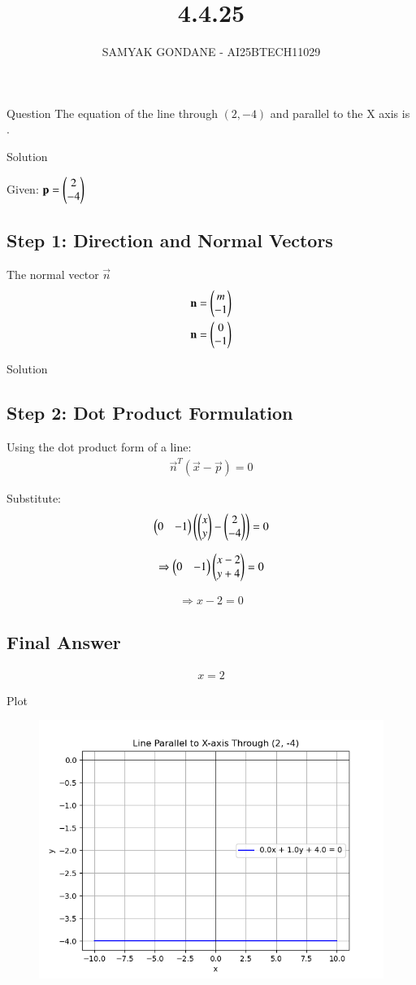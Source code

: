 \documentclass{beamer}
\title 
{4.4.25}
\date{}
\author
{SAMYAK GONDANE - AI25BTECH11029}
\begin{document}
\frame{\titlepage}

\begin{frame}{Question}
The equation of the line through $(2, -4)$ and parallel to the X axis is \underline{\hspace{2 cm}}.
\end{frame}

\begin{frame}{Solution}

Given: $\mathbf{p} = \begin{pmatrix}2 \\ -4\end{pmatrix}$

\subsection*{Step 1: Direction and Normal Vectors}
The normal vector $\vec{n}$
\begin{align}
\mathbf{n} = \begin{pmatrix}m \\ -1\end{pmatrix}\\
\mathbf{n} = \begin{pmatrix}0 \\ -1\end{pmatrix}
\end{align}
\end{frame}

\begin{frame}{Solution}
\subsection*{Step 2: Dot Product Formulation}
Using the dot product form of a line:
\begin{align}
\vec{n}^T (\vec{x} - \vec{p}) = 0
\end{align}

Substitute:
\begin{align}
\begin{pmatrix}0 & -1\end{pmatrix} \begin{pmatrix}\begin{pmatrix}x \\ y\end{pmatrix} - \begin{pmatrix}2 \\ -4\end{pmatrix}\end{pmatrix} = 0
\end{align}

\begin{align}
\Rightarrow \begin{pmatrix}0 & -1\end{pmatrix} \begin{pmatrix}x - 2 \\ y + 4\end{pmatrix} = 0
\end{align}

\begin{align}
\Rightarrow x - 2 = 0
\end{align}

\subsection*{Final Answer}
\begin{align}
\boxed{x = 2}
\end{align}
\end{frame}

\begin{frame}{Plot}
    \begin{figure}
        \centering
        \includegraphics[width=0.5\linewidth]{./figs/Figure_1.png}
        \caption{}
        \label{fig:fig1}
    \end{figure}
\end{frame}
\end{document}
